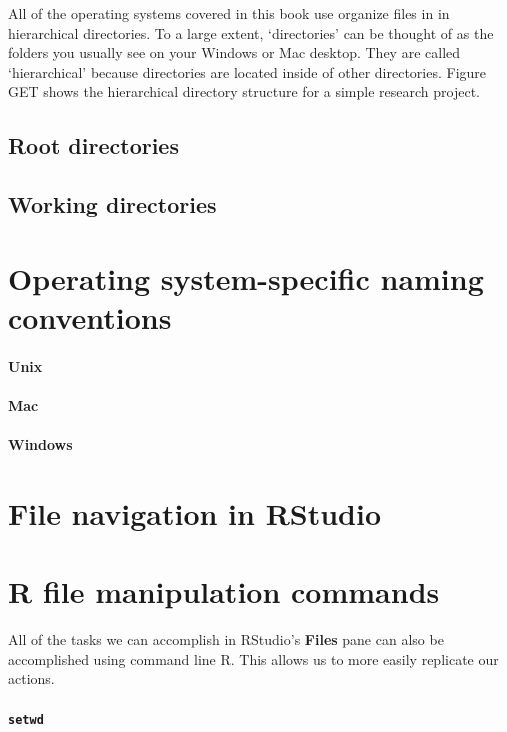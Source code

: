 \documentclass[ChapterTOCs,krantz1]{krantz}\usepackage{graphicx, color}
\begin{document}
All of the operating systems covered in this book use organize files in in hierarchical directories. To a large extent, `directories' can be thought of as the folders you usually see on your Windows or Mac desktop. They are called `hierarchical' because directories are located inside of other directories. Figure GET shows the hierarchical directory structure for a simple research project.

\subsection{Root directories}

\subsection{Working directories}

\section{Operating system-specific naming conventions}

\paragraph{Unix}

\paragraph{Mac}

\paragraph{Windows}

\section{File navigation in RStudio}

\section{R file manipulation commands}

All of the tasks we can accomplish in RStudio's {\bf{Files}} pane can also be accomplished using command line R. This allows us to more easily replicate our actions. 

\paragraph{{\tt{setwd}}}
\end{document}
